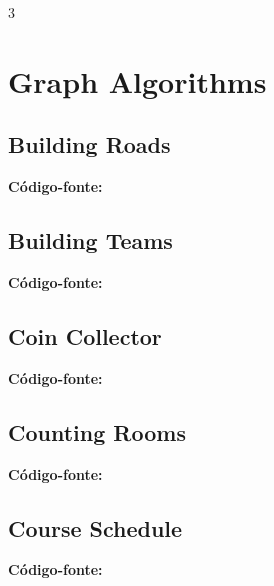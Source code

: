 \documentclass[8pt]{extarticle}
\begin{document}
\begin{multicols*}{3}

\section{Graph Algorithms}

\subsection{Building Roads}
\begin{caixaenunciado}

\end{caixaenunciado}
\vspace{0.3cm}
\noindent\textbf{Código-fonte:}


\subsection{Building Teams}
\begin{caixaenunciado}

\end{caixaenunciado}
\vspace{0.3cm}
\noindent\textbf{Código-fonte:}


\subsection{Coin Collector}
\begin{caixaenunciado}

\end{caixaenunciado}
\vspace{0.3cm}
\noindent\textbf{Código-fonte:}


\subsection{Counting Rooms}
\begin{caixaenunciado}

\end{caixaenunciado}
\vspace{0.3cm}
\noindent\textbf{Código-fonte:}


\subsection{Course Schedule}
\begin{caixaenunciado}

\end{caixaenunciado}
\vspace{0.3cm}
\noindent\textbf{Código-fonte:}



\end{multicols*}
\end{document}
